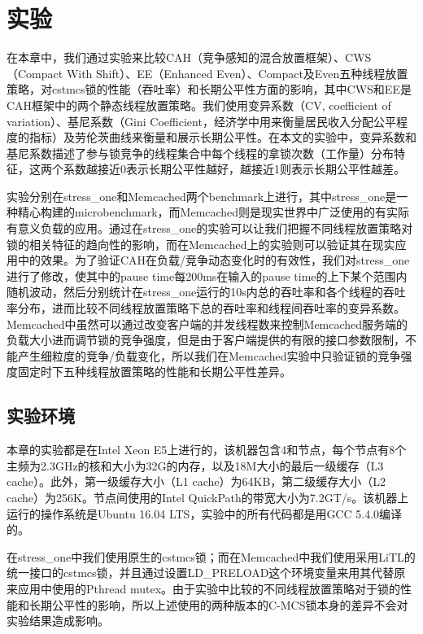 
\chapter{实验}
\label{chap:example}
在本章中，我们通过实验来比较CAH（竞争感知的混合放置框架）、CWS（Compact With Shift）、EE（Enhanced Even）、Compact及Even五种线程放置策略，对cstmcs锁的性能（吞吐率）和长期公平性方面的影响，其中CWS和EE是CAH框架中的两个静态线程放置策略。我们使用变异系数（CV, coefficient of variation）、基尼系数\cite{gini1912variabilita}（Gini Coefficient，经济学中用来衡量居民收入分配公平程度的指标）及劳伦茨曲线来衡量和展示长期公平性。在本文的实验中，变异系数和基尼系数描述了参与锁竞争的线程集合中每个线程的拿锁次数（工作量）分布特征，这两个系数越接近0表示长期公平性越好，越接近1则表示长期公平性越差。

实验分别在stress\_one和Memcached两个benchmark上进行，其中stress\_one是一种精心构建的microbenchmark，而Memcached则是现实世界中广泛使用的有实际有意义负载的应用。通过在stress\_one的实验可以让我们把握不同线程放置策略对锁的相关特征的趋向性的影响，而在Memcached上的实验则可以验证其在现实应用中的效果。为了验证CAH在负载/竞争动态变化时的有效性，我们对stress\_one进行了修改，使其中的pause time每200ms在输入的pause time的上下某个范围内随机波动，然后分别统计在stress\_one运行的10s内总的吞吐率和各个线程的吞吐率分布，进而比较不同线程放置策略下总的吞吐率和线程间吞吐率的变异系数。Memcached中虽然可以通过改变客户端的并发线程数来控制Memcached服务端的负载大小进而调节锁的竞争强度，但是由于客户端提供的有限的接口参数限制，不能产生细粒度的竞争/负载变化，所以我们在Memcached实验中只验证锁的竞争强度固定时下五种线程放置策略的性能和长期公平性差异。

\section{实验环境}
本章的实验都是在Intel Xeon E5上进行的，该机器包含4和节点，每个节点有8个主频为2.3GHz的核和大小为32G的内存，以及18M大小的最后一级缓存（L3 cache）。此外，第一级缓存大小（L1 cache）为64KB，第二级缓存大小（L2 cache）为256K。节点间使用的Intel QuickPath的带宽大小为7.2GT/s。该机器上运行的操作系统是Ubuntu 16.04 LTS，实验中的所有代码都是用GCC 5.4.0编译的。

在stress\_one中我们使用原生的cstmcs锁；而在Memcached中我们使用采用LiTL的统一接口的cstmcs锁，并且通过设置LD\_PRELOAD这个环境变量来用其代替原来应用中使用的Pthread mutex。由于实验中比较的不同线程放置策略对于锁的性能和长期公平性的影响，所以上述使用的两种版本的C-MCS锁本身的差异不会对实验结果造成影响。

